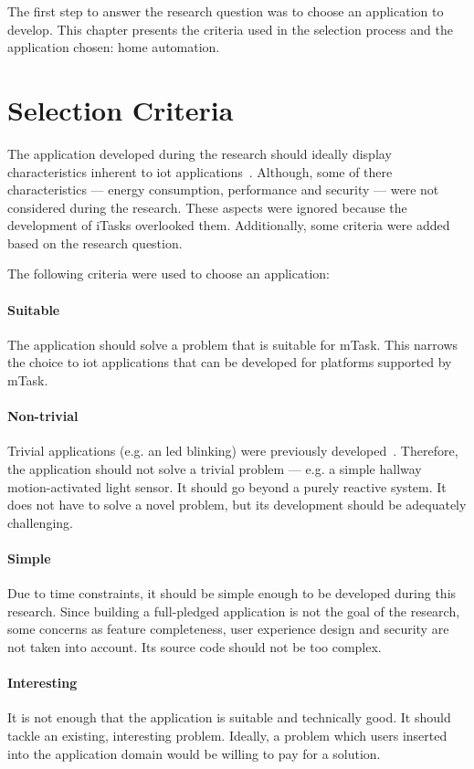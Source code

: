 The first step to answer the research question was to choose an application to develop. This chapter presents the criteria used in the selection process and the application chosen: home automation.

\section{Selection Criteria}\label{sec:selec_cri}

The application developed during the research should ideally display characteristics inherent to \acs{iot} applications~\cite{survey,survey2,survey3}. Although, some of there characteristics --- energy consumption, performance and security --- were not considered during the research. These aspects were ignored because the development of \gls{iTasks} overlooked them. Additionally, some criteria were added based on the research question.

The following criteria were used to choose an application:

\paragraph{Suitable} The application should solve a problem that is suitable for \gls{mTask}. This narrows the choice to \ac{iot} applications that can be developed for platforms supported by \gls{mTask}.

\paragraph{Non-trivial} Trivial applications (e.g. an \acs{led} blinking) were previously developed~\cite{martthesis}. Therefore, the application should not solve a trivial problem --- e.g. a simple hallway  motion-activated light sensor. It should go beyond a purely reactive system. It does not have to solve a novel problem, but its development should be adequately challenging.

\paragraph{Simple} Due to time constraints, it should be simple enough to be developed during this research. Since building a full-pledged application is not the goal of the research, some concerns as feature completeness, user experience design and security are not taken into account. Its source code should not be too complex.

\paragraph{Interesting} It is not enough that the application is suitable and technically good. It should tackle an existing, interesting problem. Ideally, a problem which users inserted into the application domain would be willing to pay for a solution.


